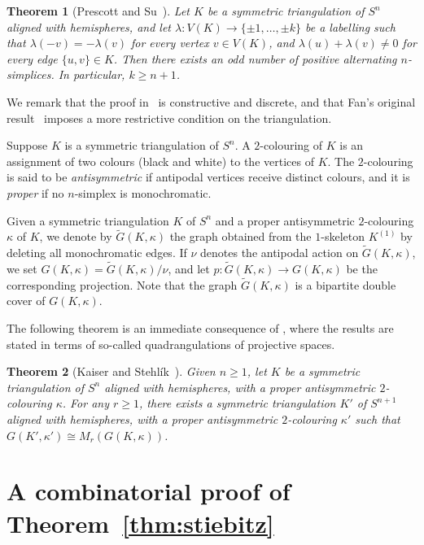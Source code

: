 \documentclass[11pt,a4paper]{amsart}
\newtheorem{theorem}{Theorem}[section]
\begin{document}
\begin{theorem}[Prescott and Su~\cite{PS05}]
\label{thm:fan}
  Let $K$ be a symmetric triangulation of $S^n$ aligned
  with hemispheres, and let $\lambda:V(K)\to \{\pm1, \ldots, \pm k\}$
  be a labelling such that $\lambda(-v)=-\lambda(v)$ for every vertex
  $v \in V(K)$, and $\lambda(u)+\lambda(v) \neq 0$ for every edge $\{u,v\} \in K$. 
  Then there exists an odd number of
  positive alternating $n$-simplices. In particular, $k \geq n+1$.
\end{theorem}
We remark that the proof
in~\cite{PS05} is constructive and discrete, and that Fan's original
result~\cite{Fan52} imposes a more restrictive condition on the triangulation.

Suppose $K$ is a symmetric triangulation of $S^n$. A $2$-colouring
of $K$ is an assignment of two colours (black and white) to the vertices
of $K$. The $2$-colouring is said to be \emph{antisymmetric} if antipodal
vertices receive distinct colours, and it is \emph{proper} if no
$n$-simplex is monochromatic.

Given a symmetric triangulation $K$ of $S^n$ and a proper antisymmetric
$2$-colouring $\kappa$ of $K$, we denote by $\tilde G(K,\kappa)$ the graph
obtained from the $1$-skeleton $K^{(1)}$ by deleting all monochromatic
edges. If $\nu$ denotes the antipodal action on $\tilde G(K,\kappa)$,
we set $G(K,\kappa)=\tilde G(K,\kappa)/\nu$, and let
$p:\tilde G(K,\kappa) \to G(K,\kappa)$ be the corresponding projection.
Note that the graph $\tilde G(K,\kappa)$ is a bipartite double cover of
$G(K,\kappa)$.

The following theorem is an immediate consequence of
\cite[Lemma~3.2 and Theorem~6.1]{KS15}, where the results are stated
in terms of so-called quadrangulations of projective spaces.
\begin{theorem}[Kaiser and Stehl\'ik~\cite{KS15}]
\label{thm:mycielski-projective}
  Given $n\geq 1$, let $K$ be a symmetric triangulation of $S^n$ aligned with hemispheres, with a proper
  antisymmetric $2$-colouring $\kappa$.
  For any $r \geq 1$, there exists a symmetric triangulation $K'$ of $S^{n+1}$
  aligned with hemispheres,
  with a proper antisymmetric $2$-colouring $\kappa'$ such that
  $G(K',\kappa')\cong M_r(G(K,\kappa))$.
\end{theorem}

\section{A combinatorial proof of Theorem~\ref{thm:stiebitz}}
\end{document}
